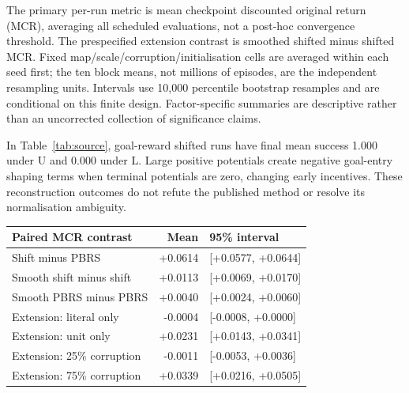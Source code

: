 \documentclass{COMPXXXX}
\begin{document}
The primary per-run metric is mean checkpoint discounted original return (MCR), averaging all scheduled evaluations, not a post-hoc convergence threshold. The prespecified extension contrast is smoothed shifted minus shifted MCR. Fixed map/scale/corruption/initialisation cells are averaged within each seed first; the ten block means, not millions of episodes, are the independent resampling units. Intervals use 10,000 percentile bootstrap resamples and are conditional on this finite design. Factor-specific summaries are descriptive rather than an uncorrected collection of significance claims.



In Table~\ref{tab:source}, goal-reward shifted runs have final mean success 1.000 under U and 0.000 under L. Large positive potentials create negative goal-entry shaping terms when terminal potentials are zero, changing early incentives. These reconstruction outcomes do not refute the published method or resolve its normalisation ambiguity.



\par\medskip
\noindent\begin{minipage}{\linewidth}\tabsize
\centering
\begin{tabular}{@{}p{.47\linewidth}r p{.31\linewidth}@{}}
\hline
Paired MCR contrast & Mean & 95\% interval\\
\hline
Shift minus PBRS & +0.0614 & [+0.0577, +0.0644] \\
Smooth shift minus shift & +0.0113 & [+0.0069, +0.0170] \\
Smooth PBRS minus PBRS & +0.0040 & [+0.0024, +0.0060] \\
Extension: literal only & -0.0004 & [-0.0008, +0.0000] \\
Extension: unit only & +0.0231 & [+0.0143, +0.0341] \\
Extension: 25\% corruption & -0.0011 & [-0.0053, +0.0036] \\
Extension: 75\% corruption & +0.0339 & [+0.0216, +0.0505] \\
\hline
\end{tabular}
\label{tab:contrasts}
\end{minipage}\par\medskip
\end{document}
